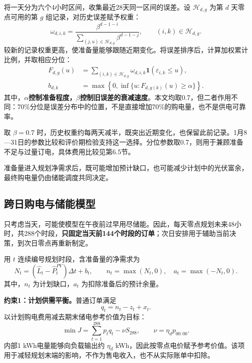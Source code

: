 将一天分为六个4小时区间，收集最近28天同一区间的误差。设 $\mathcal H_{d,g}$ 为第 $d$ 天零点可用的第 $g$ 组记录，对历史误差赋予权重：
\begin{equation}
\omega_{d,i,k}=\frac{\beta^{d-1-i}}{\displaystyle\sum_{(j,u)\in\mathcal H_{d,g}}\beta^{d-1-j}},\qquad (i,k)\in\mathcal H_{d,g}.
\label{eq:q2_weight}
\end{equation}
较新的记录权重更高，使准备量能够跟随近期变化。将误差排序后，计算加权累计比例，并取相应分位：
\begin{align}
F_{d,g}(u)&=\sum_{(i,k)\in\mathcal H_{d,g}}\omega_{d,i,k}\mathbf1(\varepsilon_{i,k}\le u),\label{eq:q2_cdf}\\
b_{d,k}&=\max\left\{0,\inf\{u:F_{d,g(k)}(u)\ge\alpha\}\right\}.\label{eq:q2_reserve}
\end{align}
其中，\textbf{$\alpha$控制准备程度，$\beta$控制旧误差的衰减速度}。本文均取0.7，但二者作用不同：70\%分位是误差分布中的位置，不是直接增加70\%的购电量，也不是供电可靠率。

取 $\beta=0.7$ 时，历史权重约每两天减半，既突出近期变化，也保留此前记录。1月8—31日的参数比较和评价期检验支持这一选择。分位参数取0.7，则用于兼顾准备不足与过量订电，具体费用比较见第6.5节。

准备量进入规划净需求后，既可能增加预计缺口，也可能减少计划中的光伏富余，最终购电量仍由储能调度共同决定。

\subsection{跨日购电与储能模型}
只考虑当天，可能使模型在午夜前过早用尽储能。因此，每天零点规划未来48小时，共288个时段，\textbf{只固定当天前144个时段的订单}；次日安排用于辅助当前决策，到次日零点再重新制定。

用 $t$ 连续编号规划时段，含准备量的净需求为
\begin{equation}
N_t=(\widehat L_t-\widehat P^{PV}_t)\Delta t+b_t,\qquad
n_t=\max(N_t,0),\quad a_t=\max(-N_t,0).
\label{eq:q2_net_demand}
\end{equation}
其中，$n_t$ 为计划缺口，$a_t$ 为扣除准备后的预计余量。

\noindent\textbf{约束1：计划供需平衡。}普通订单满足
\begin{equation}
q_t=n_t-z_t+x_t.
\label{eq:q2_purchase}
\end{equation}
以计划购电费用减去期末储电参考价值为目标：
\begin{equation}
\min J=\sum_{t=1}^{288}p_tq_t-\nu S_{288},\qquad \nu=\eta_dp_{00:00}.
\label{eq:q2_objective}
\end{equation}
内部1 kWh电量能够向负载输出约 $\eta_d$ kWh，因此按零点电价赋予参考价值。该项用于减轻规划末端的影响，不作为售电收入，也不从实际账单中扣除。

